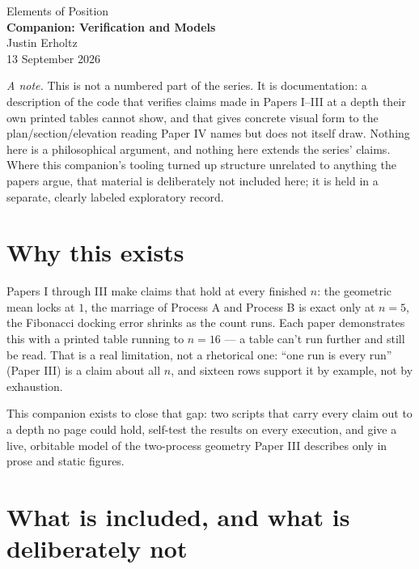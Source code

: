 \documentclass[10pt,a4paper]{article}
\begin{document}
\begin{center}
\vspace*{1.0em}
{\large Elements of Position}\\[1.0em]
{\LARGE\bfseries Companion: Verification and Models}\\[1.4em]
{\normalsize Justin Erholtz}\\[0.3em]
{\small 13 September 2026}
\end{center}

\vspace{1.2em}

\noindent
\textit{A note.}
This is not a numbered part of the series. It is documentation: a
description of the code that verifies claims made in Papers I--III at a
depth their own printed tables cannot show, and that gives concrete visual
form to the plan/section/elevation reading Paper IV names but does not
itself draw. Nothing here is a philosophical argument, and nothing here
extends the series' claims. Where this companion's tooling turned up
structure unrelated to anything the papers argue, that material is
deliberately not included here; it is held in a separate, clearly labeled
exploratory record.

\vspace{0.8em}

\section{Why this exists}

Papers I through III make claims that hold at every finished $n$: the
geometric mean locks at $1$, the marriage of Process A and Process B is
exact only at $n=5$, the Fibonacci docking error shrinks as the count
runs. Each paper demonstrates this with a printed table running to
$n=16$ --- a table can't run further and still be read. That is a real
limitation, not a rhetorical one: ``one run is every run'' (Paper III)
is a claim about all $n$, and sixteen rows support it by example, not
by exhaustion.

This companion exists to close that gap: two scripts that carry every
claim out to a depth no page could hold, self-test the results on every
execution, and give a live, orbitable model of the two-process geometry
Paper III describes only in prose and static figures.

\section{What is included, and what is deliberately not}
\end{document}

